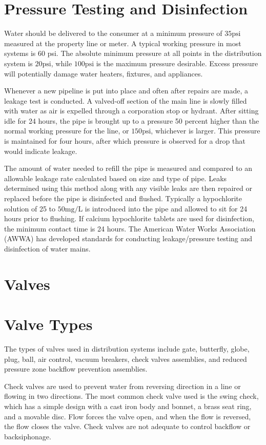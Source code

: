\documentclass[10pt]{article}
\begin{document}
\section{Pressure Testing and Disinfection}
Water should be delivered to the consumer at a minimum pressure of $35 \mathrm{psi}$ measured at the property line or meter. A typical working pressure in most systems is 60 psi. The absolute minimum pressure at all points in the distribution system is $20 \mathrm{psi}$, while $100 \mathrm{psi}$ is the maximum pressure desirable. Excess pressure will potentially damage water heaters, fixtures, and appliances.

Whenever a new pipeline is put into place and often after repairs are made, a leakage test is conducted. A valved-off section of the main line is slowly filled with water as air is expelled through a corporation stop or hydrant. After sitting idle for 24 hours, the pipe is brought up to a pressure 50 percent higher than the normal working pressure for the line, or $150 \mathrm{psi}$, whichever is larger. This pressure is maintained for four hours, after which pressure is observed for a drop that would indicate leakage.

The amount of water needed to refill the pipe is measured and compared to an allowable leakage rate calculated based on size and type of pipe. Leaks determined using this method along with any visible leaks are then repaired or replaced before the pipe is disinfected and flushed. Typically a hypochlorite solution of 25 to $50 \mathrm{mg} / \mathrm{L}$ is introduced into the pipe and allowed to sit for 24 hours prior to flushing. If calcium hypochlorite tablets are used for disinfection, the minimum contact time is 24 hours. The American Water Works Association (AWWA) has developed standards for conducting leakage/pressure testing and disinfection of water mains.

\section{Valves}
\section{Valve Types}
The types of valves used in distribution systems include gate, butterfly, globe, plug, ball, air control, vacuum breakers, check valves assemblies, and reduced pressure zone backflow prevention assemblies.

Check valves are used to prevent water from reversing direction in a line or flowing in two directions. The most common check valve used is the swing check, which has a simple design with a cast iron body and bonnet, a brass seat ring, and a movable disc. Flow forces the valve open, and when the flow is reversed, the flow closes the valve. Check valves are not adequate to control backflow or backsiphonage.
\end{document}
